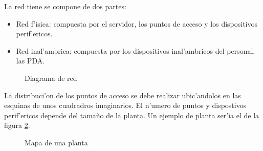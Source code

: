 La red tiene se compone de dos partes:
\begin{itemize}
\item Red f'isica: compuesta por el servidor, los puntos de acceso y los dispositivos perif'ericos.
\item Red inal'ambrica: compuesta por los dispositivos inal'ambricos del personal, las PDA.
\end{itemize}
\begin{figure}[h!]
	\begin{center}
     	\end{center}
    	\caption{Diagrama de red}
	\label{fig:diaRed}
\end{figure}

La distribuci'on de los puntos de acceso se debe realizar ubic'andolos en las esquinas de unos cuadradros imaginarios. El n'umero de puntos y dispostivos  perif'ericos depende del tamaño de la planta. Un ejemplo de planta ser'ia el de la figura \ref{fig:diaPlantaRed}.
\begin{figure}[h!]
	\begin{center}
     	\end{center}
    	\caption{Mapa de una planta}
	\label{fig:diaPlantaRed}
\end{figure}